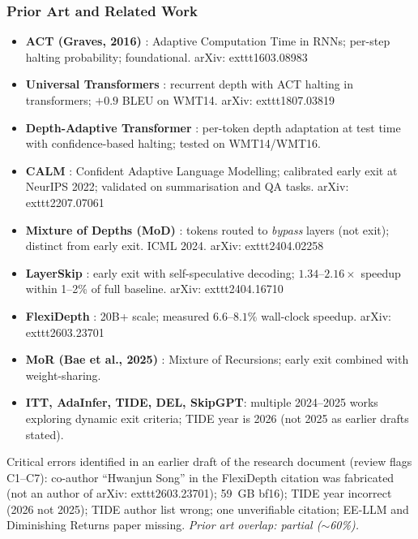 \documentclass[11pt]{article}
\begin{document}
\subsubsection*{Prior Art and Related Work}
\begin{itemize}
  \item \textbf{ACT (Graves, 2016)} \cite{Graves2016}: Adaptive Computation Time in RNNs; per-step halting probability; foundational.
    arXiv:	exttt{1603.08983}

  \item \textbf{Universal Transformers} \cite{DehghaniEtAl2019}: recurrent depth with ACT halting in transformers; $+0.9$ BLEU on WMT14.
    arXiv:	exttt{1807.03819}

  \item \textbf{Depth-Adaptive Transformer} \cite{ElbayadEtAl2020}: per-token depth adaptation at test time with confidence-based halting; tested on WMT14/WMT16.

  \item \textbf{CALM} \cite{SchusterEtAl2022}: Confident Adaptive Language Modelling; calibrated early exit at NeurIPS 2022; validated on summarisation and QA tasks.
    arXiv:	exttt{2207.07061}

  \item \textbf{Mixture of Depths (MoD)} \cite{RaposoEtAl2024}: tokens routed to \emph{bypass} layers (not exit); distinct from early exit.
    ICML 2024.
    arXiv:	exttt{2404.02258}

  \item \textbf{LayerSkip} \cite{ElhoushiEtAl2024}: early exit with self-speculative decoding; $1.34$--$2.16\times$ speedup within 1--2\% of full baseline.
    arXiv:	exttt{2404.16710}

  \item \textbf{FlexiDepth} \cite{GaoEtAl2024}: 20B+ scale; measured $6.6$--$8.1\%$ wall-clock speedup.
    arXiv:	exttt{2603.23701}

  \item \textbf{MoR (Bae et al., 2025)} \cite{BaeEtAl2025}: Mixture of Recursions; early exit combined with weight-sharing.

  \item \textbf{ITT, AdaInfer, TIDE, DEL, SkipGPT}: multiple 2024--2025 works exploring dynamic exit criteria; TIDE year is 2026 (not 2025 as earlier drafts stated).
\end{itemize}

\noindent
Critical errors identified in an earlier draft of the research document (review flags C1--C7):
co-author ``Hwanjun Song'' in the FlexiDepth citation was fabricated (not an author of arXiv:	exttt{2603.23701});
59~GB bf16);
TIDE year incorrect (2026 not 2025);
TIDE author list wrong;
one unverifiable citation;
EE-LLM and Diminishing Returns paper missing.
\emph{Prior art overlap: partial ($\sim$60\%).}
\end{document}
